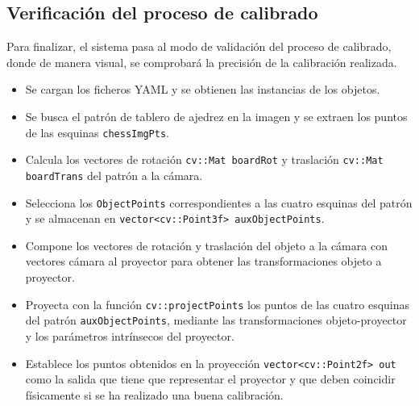 \subsection{Verificación del proceso de calibrado}
Para finalizar, el sistema pasa al modo de validación del proceso de calibrado, donde de manera visual, se comprobará la precisión de la calibración realizada.
\begin{itemize}
\item Se cargan los ficheros YAML y se obtienen las instancias de los objetos.

\item Se busca el patrón de tablero de ajedrez en la imagen y se extraen los puntos de las esquinas \texttt{chessImgPts}.

\item Calcula los vectores de rotación \texttt{cv::Mat boardRot} y traslación \texttt{cv::Mat boardTrans} del patrón a la cámara.

\item Selecciona los \texttt{ObjectPoints} correspondientes a las cuatro esquinas del patrón y se almacenan en \texttt{vector<cv::Point3f> auxObjectPoints}.


\item Compone los vectores de rotación y traslación del objeto a la cámara con vectores cámara al proyector para obtener las transformaciones objeto a proyector.

\item Proyecta con la función \texttt{cv::projectPoints} los puntos de las cuatro esquinas del patrón \texttt{auxObjectPoints}, mediante las transformaciones objeto-proyector y los parámetros intrínsecos del proyector.


\item Establece los puntos obtenidos en la proyección \texttt{vector<cv::Point2f> out} como la salida que tiene que representar el proyector y que deben coincidir físicamente si se ha realizado una buena calibración. %
\end{itemize}

